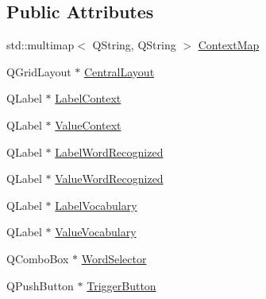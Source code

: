 \subsection*{Public Attributes}
\begin{DoxyCompactItemize}
\item 
std\-::multimap$<$ Q\-String, Q\-String $>$ \hyperlink{classmts_c_m_u_sphinx4_qt_widget_a215fe8155a1355a1c156e2e9e74fdb92}{Context\-Map}
\item 
Q\-Grid\-Layout $\ast$ \hyperlink{classmts_c_m_u_sphinx4_qt_widget_afdd1f19a4fc670f2c558c8f92dc14a6a}{Central\-Layout}
\item 
Q\-Label $\ast$ \hyperlink{classmts_c_m_u_sphinx4_qt_widget_afcbba988a817bb56ff641dcd339c4edd}{Label\-Context}
\item 
Q\-Label $\ast$ \hyperlink{classmts_c_m_u_sphinx4_qt_widget_aafd0a44410ae8607b17990de2e6c51b9}{Value\-Context}
\item 
Q\-Label $\ast$ \hyperlink{classmts_c_m_u_sphinx4_qt_widget_af2821b4951e68f96c43d5d94d7c4bd77}{Label\-Word\-Recognized}
\item 
Q\-Label $\ast$ \hyperlink{classmts_c_m_u_sphinx4_qt_widget_a2fb5f8ac612123f74c38a522309ecf80}{Value\-Word\-Recognized}
\item 
Q\-Label $\ast$ \hyperlink{classmts_c_m_u_sphinx4_qt_widget_ac33991a517fe078cc31fda51fb9593f2}{Label\-Vocabulary}
\item 
Q\-Label $\ast$ \hyperlink{classmts_c_m_u_sphinx4_qt_widget_adc1e85d87dc16c7c8cfa4a005465a401}{Value\-Vocabulary}
\item 
Q\-Combo\-Box $\ast$ \hyperlink{classmts_c_m_u_sphinx4_qt_widget_a3d6acb7e4e230bd1b0b3ca90aba15522}{Word\-Selector}
\item 
Q\-Push\-Button $\ast$ \hyperlink{classmts_c_m_u_sphinx4_qt_widget_ae499f93f33d510e31e91a03901091103}{Trigger\-Button}
\end{DoxyCompactItemize}


